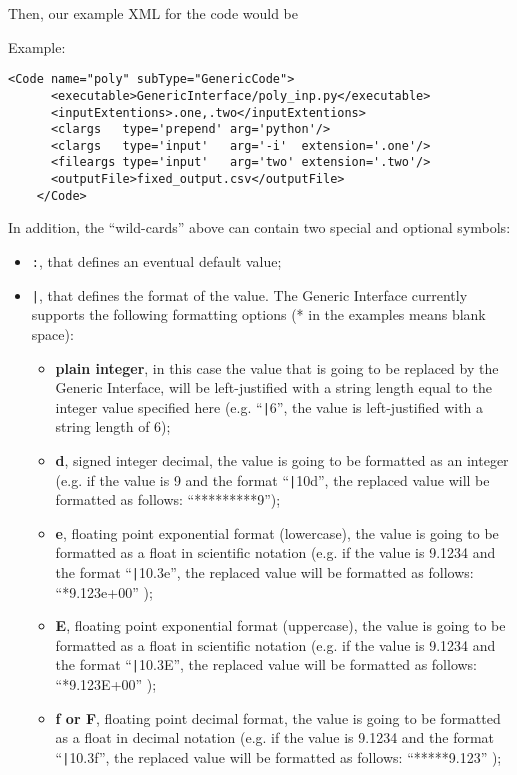 Then, our example XML for the code would be

Example:
\begin{lstlisting}[style=XML]
    <Code name="poly" subType="GenericCode">
      <executable>GenericInterface/poly_inp.py</executable>
      <inputExtentions>.one,.two</inputExtentions>
      <clargs   type='prepend' arg='python'/>
      <clargs   type='input'   arg='-i'  extension='.one'/>
      <fileargs type='input'   arg='two' extension='.two'/>
      <outputFile>fixed_output.csv</outputFile>
    </Code>
\end{lstlisting}

In addition, the ``wild-cards'' above can contain two special and optional symbols:
\begin{itemize}
  \item  \texttt{:}, that defines an eventual default value;
  \item  \texttt{|}, that defines the format of the value. The  Generic Interface currently supports the following formatting options (* in the examples means blank space):
    \begin{itemize}
       \item \textbf{plain integer}, in this case  the value that is going to be replaced by the Generic Interface, will be left-justified with a string length equal to the integer value specified here (e.g. ``\texttt{|}6'', the value is left-justified with a string length of 6);
      \item \textbf{d}, signed integer decimal, the value is going to be formatted as an integer (e.g.  if the value is 9 and the format ``\texttt{|}10d'', the replaced value will be formatted as follows: ``*********9'');
      \item \textbf{e}, floating point exponential format (lowercase), the value is going to be formatted as a float in scientific notation (e.g. if the value is 9.1234 and the format ``\texttt{|}10.3e'', the replaced value will be formatted as follows: ``*9.123e+00'' );
      \item \textbf{E}, floating point exponential format (uppercase), the value is going to be formatted as a float in scientific notation (e.g. if the value is 9.1234 and the format ``\texttt{|}10.3E'', the replaced value will be formatted as follows: ``*9.123E+00'' );
      \item \textbf{f or F}, floating point decimal format, the value is going to be formatted as a float in decimal notation (e.g. if the value is 9.1234 and the format ``\texttt{|}10.3f'', the replaced value will be formatted as follows: ``*****9.123'' );

\end{itemize}
\end{itemize}
